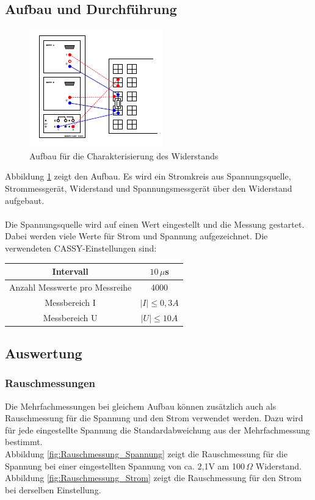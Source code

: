 \documentclass[12pt,a4paper]{article}
\begin{document}
\subsection{Aufbau und Durchführung}
\begin{figure}
\begin{center}
\includegraphics[scale=1.2]{Bilder/Charakterisierung_Widerstand_Aufbau.PNG}
\end{center}
\caption[Widerstand Schaltung]{Aufbau für die Charakterisierung des Widerstands}
\label{fig:Widerstand_Aufbau}
\end{figure}
Abbildung \ref{fig:Widerstand_Aufbau} zeigt den Aufbau. Es wird ein Stromkreis aus Spannungsquelle, Strommessgerät, Widerstand und Spannungsmessgerät über den Widerstand aufgebaut.\\
\\ Die Spannungsquelle wird auf einen Wert eingestellt und die Messung gestartet. Dabei werden viele Werte für Strom und Spannung aufgezeichnet. Die verwendeten CASSY-Einstellungen sind:\\
\begin{center}
\begin{tabular}{|c|c|}

\hline 
Intervall & $10 \, \mu$s \\ 
\hline 
Anzahl Messwerte pro Messreihe & 4000 \\ 
\hline 
Messbereich I & $|I| \leq 0,3A$ \\ 
\hline 
Messbereich U & $|U| \leq 10A$ \\ 
\hline 

\end{tabular} 
\end{center}
\subsection{Auswertung}
\subsubsection{Rauschmessungen}
Die Mehrfachmessungen bei gleichem Aufbau können zusätzlich auch als Rauschmessung für die Spannung und den Strom verwendet werden. Dazu wird für jede eingestellte Spannung die Standardabweichung aus der Mehrfachmessung bestimmt. \\
Abbildung \ref{fig:Rauschmessung_Spannung} zeigt die Rauschmessung für die Spannung bei einer eingestellten Spannung von ca. 2,1V am 100$\, \Omega$ Widerstand. Abbildung \ref{fig:Rauschmessung_Strom} zeigt die Rauschmessung für den Strom bei derselben Einstellung. \\
\end{document}
